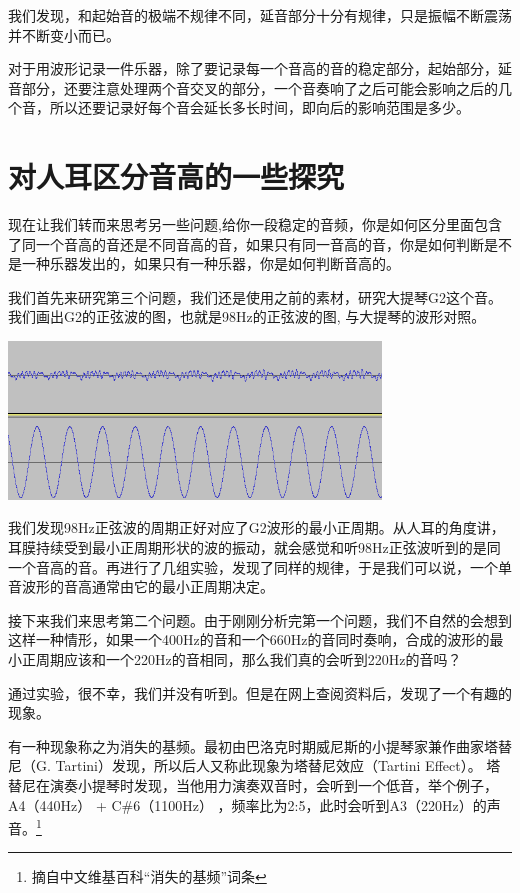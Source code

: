 \vspace{1cm}
\par
我们发现，和起始音的极端不规律不同，延音部分十分有规律，只是振幅不断震荡并不断变小而已。
\par
对于用波形记录一件乐器，除了要记录每一个音高的音的稳定部分，起始部分，延音部分，还要注意处理两个音交叉的部分，一个音奏响了之后可能会影响之后的几个音，所以还要记录好每个音会延长多长时间，即向后的影响范围是多少。
\section{对人耳区分音高的一些探究}
\par
现在让我们转而来思考另一些问题,给你一段稳定的音频，你是如何区分里面包含了同一个音高的音还是不同音高的音，如果只有同一音高的音，你是如何判断是不是一种乐器发出的，如果只有一种乐器，你是如何判断音高的。
\par 
我们首先来研究第三个问题，我们还是使用之前的素材，研究大提琴G2这个音。我们画出G2的正弦波的图，也就是98Hz的正弦波的图, 与大提琴的波形对照。
\vspace{1cm}
\begin{center}
    \includegraphics[height=4.2cm]{compare.png}
\end{center}
\vspace{1cm}
\par
我们发现98Hz正弦波的周期正好对应了G2波形的最小正周期。从人耳的角度讲，耳膜持续受到最小正周期形状的波的振动，就会感觉和听98Hz正弦波听到的是同一个音高的音。再进行了几组实验，发现了同样的规律，于是我们可以说，一个单音波形的音高通常由它的最小正周期决定。
\par
接下来我们来思考第二个问题。由于刚刚分析完第一个问题，我们不自然的会想到这样一种情形，如果一个400Hz的音和一个660Hz的音同时奏响，合成的波形的最小正周期应该和一个220Hz的音相同，那么我们真的会听到220Hz的音吗？
\par
通过实验，很不幸，我们并没有听到。但是在网上查阅资料后，发现了一个有趣的现象。
\par
有一种现象称之为消失的基频。最初由巴洛克时期威尼斯的小提琴家兼作曲家塔替尼（G. Tartini）发现，所以后人又称此现象为塔替尼效应（Tartini Effect）。 塔替尼在演奏小提琴时发现，当他用力演奏双音时，会听到一个低音，举个例子，A4（440Hz） + C\#6（1100Hz） ，频率比为2:5，此时会听到A3（220Hz）的声音。\footnote{摘自中文维基百科``消失的基频''词条}
